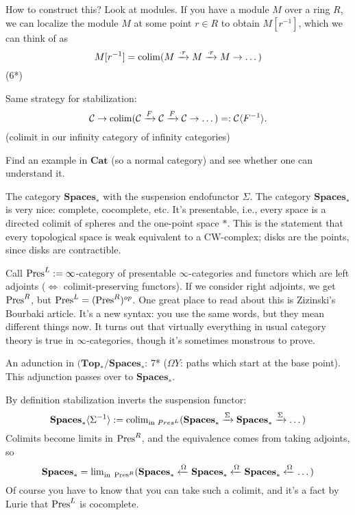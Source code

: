 \documentclass[../MH_Total.tex]{subfiles}
\begin{document}
How to construct this? Look at modules. If you have a module $M$ over a ring $R$, we can localize the module $M$ at some point $r \in R$ to obtain $M[r^{-1}]$, which we can think of as
\[
M[r^{-1}] = \operatorname{colim}(M \xrightarrow{\cdot r} M \xrightarrow{\cdot r} M \to \dots)
\]
(6*)

Same strategy for stabilization:
\[
\mathcal{C} \to \operatorname{colim}(\mathcal{C} \xrightarrow{F} \mathcal{C} \xrightarrow{F} \mathcal{C} \to \dots) =: \mathcal{C} \langle F^{-1} \rangle.
\]
(colimit in our infinity category of infinity categories)

\begin{exercise}
	Find an example in $\mathbf{Cat}$ (so a normal category) and see whether one can understand it. 
\end{exercise}

\begin{example}
	The category $\mathbf{Spaces}_*$ with the suspension endofunctor $\Sigma$. The category $\mathbf{Spaces}_*$ is very nice: complete, cocomplete, etc. It's presentable, i.e., every space is a directed colimit of spheres and the one-point space $*$. This is the statement that every topological space is weak equivalent to a CW-complex; disks are the points, since disks are contractible.

	Call $\operatorname{Pres}^L := \infty$-category of presentable $\infty$-categories and functors which are left adjoints ($\Leftrightarrow$ colimit-preserving functors). If we consider right adjoints, we get $\operatorname{Pres}^R$, but $\operatorname{Pres}^L = (\operatorname{Pres}^R)^{op}$. One great place to read about this is Zizinski's Bourbaki article. It's a new syntax: you use the same words, but they mean different things now. It turns out that virtually everything in usual category theory is true in $\infty$-categories, though it's sometimes monstrous to prove.

	An adunction in $(\mathbf{Top}_*/\mathbf{Spaces}_*$: 7* ($\Omega Y$: paths which start at the base point). This adjunction passes over to $\mathbf{Spaces}_*$.

	By definition stabilization inverts the suspension functor:
	\[
	\mathbf{Spaces}_*\langle \Sigma^{-1} \rangle := \operatorname{colim}_{\text{in }Pres^L} (\mathbf{Spaces}_* \xrightarrow{\Sigma} \mathbf{Spaces}_* \xrightarrow{\Sigma} \dots)
	\]
	Colimits become limits in $\operatorname{Pres}^R$, and the equivalence comes from taking adjoints, so 
	\[
	\mathbf{Spaces}_* = \operatorname{lim}_{\text{in }\operatorname{Pres}^R} (\mathbf{Spaces}_* \xleftarrow{\Omega} \mathbf{Spaces}_* \xleftarrow{\Omega} \mathbf{Spaces}_* \xleftarrow{\Omega} \dots)
	\]
	Of course you have to know that you can take such a colimit, and it's a fact by Lurie that $\operatorname{Pres}^L$ is cocomplete.


\end{example}
\end{document}
